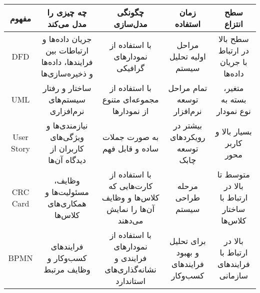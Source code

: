 \begin{tabular}{|c|c|c|c|c|}
	\hline
	مفهوم & چه چیزی را مدل می‌کند & چگونگی مدل‌سازی & زمان استفاده & سطح انتزاع \\ \hline
	DFD & جریان داده‌ها و ارتباطات بین فرایندها، داده‌ها و ذخیره‌سازی‌ها & با استفاده از نمودارهای گرافیکی & مراحل اولیه تحلیل سیستم & سطح بالا در ارتباط با جریان داده‌ها \\
	UML & ساختار و رفتار سیستم‌های نرم‌افزاری & با استفاده از مجموعه‌ای متنوع از نمودارها & تمام مراحل توسعه نرم‌افزار & متغیر، بسته به نوع نمودار \\
	User Story & نیازمندی‌ها و ویژگی‌های کاربران از دیدگاه آن‌ها & به صورت جملات ساده و قابل فهم & بیشتر در رویکردهای توسعه چابک & بسیار بالا و کاربر محور \\
	CRC Card & وظایف، مسئولیت‌ها و همکاری‌های کلاس‌ها & با استفاده از کارت‌هایی که کلاس‌ها و وظایف آن‌ها را نمایش می‌دهند & مرحله طراحی سیستم & متوسط تا بالا در ارتباط با ساختار کلاس‌ها \\
	BPMN & فرایندهای کسب‌وکار و وظایف مرتبط & با استفاده از نمودارهای فرایندی و نشانه‌گذاری‌های استاندارد & برای تحلیل و بهبود فرایندهای کسب‌وکار & بالا در ارتباط با فرایندهای سازمانی \\
	\hline
\end{tabular}